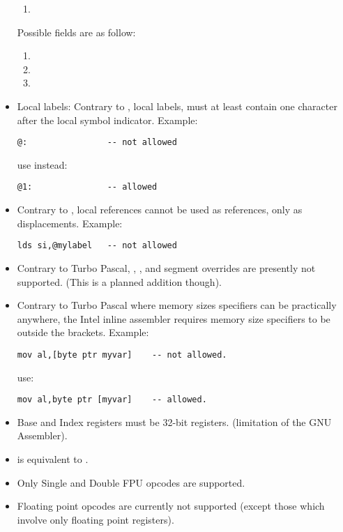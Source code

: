 \begin{itemize}
\begin{enumerate}
\item {}
\end{enumerate}
 Possible fields are as follow:
\begin{enumerate}
\item  {}
\item  {}
\item  {}
\end{enumerate}
\item  Local labels: Contrary to \tp, local labels, must
at least contain one character after the local symbol indicator.
Example:
\begin{verbatim}
@:                -- not allowed
\end{verbatim}
use instead:
\begin{verbatim}
@1:               -- allowed
\end{verbatim}
\item Contrary to \tp, local references cannot be used as references,
   only as displacements. Example:
\begin{verbatim}
lds si,@mylabel   -- not allowed
\end{verbatim}
\item  Contrary to Turbo Pascal, , ,  and
 segment overrides are presently not supported.
   (This is a planned addition though).
\item  Contrary to Turbo Pascal where memory sizes specifiers can
   be practically anywhere, the \fpc Intel inline assembler requires
   memory size specifiers to be outside the brackets. Example:
\begin{verbatim}
mov al,[byte ptr myvar]    -- not allowed.
\end{verbatim}
 use:
\begin{verbatim}
mov al,byte ptr [myvar]    -- allowed.
\end{verbatim}
\item  Base and Index registers must be 32-bit registers.
     (limitation of the GNU Assembler).
\item  {} is equivalent to .
\item  Only Single and Double FPU opcodes are supported.
\item  Floating point opcodes are currently not supported
   (except those which involve only floating point registers).
\end{itemize}

